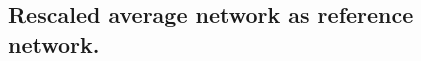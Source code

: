 \documentclass[11pt]{article}
\theoremstyle{definition}
\theoremstyle{definition}
\theoremstyle{definition}
\theoremstyle{remark}
\theoremstyle{plain}
\begin{document}
	




\subsection{Rescaled average network as reference network.}
\end{document}
